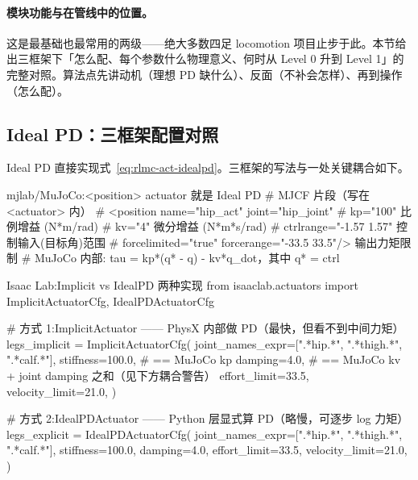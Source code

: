 \paragraph{模块功能与在管线中的位置。}这是最基础也最常用的两级——绝大多数四足 locomotion 项目止步于此。本节给出三框架下「怎么配、每个参数什么物理意义、何时从 Level 0 升到 Level 1」的完整对照。算法点先讲动机（理想 PD 缺什么）、反面（不补会怎样）、再到操作（怎么配）。

\subsection{Ideal PD：三框架配置对照}
\label{sec:rlmc-act-idealpd-cfg}

Ideal PD 直接实现式~\eqref{eq:rlmc-act-idealpd}。三框架的写法与一处关键耦合如下。

\begin{codebox}[Python]{mjlab/MuJoCo:<position> actuator 就是 Ideal PD}
# MJCF 片段（写在 <actuator> 内）
# <position name="hip_act" joint="hip_joint"
#           kp="100"                 比例增益 (N*m/rad)
#           kv="4"                   微分增益 (N*m*s/rad)
#           ctrlrange="-1.57 1.57"   控制输入(目标角)范围
#           forcelimited="true" forcerange="-33.5 33.5"/>  输出力矩限制
# MuJoCo 内部: tau = kp*(q* - q) - kv*q_dot，其中 q* = ctrl
\end{codebox}

\begin{codebox}[Python]{Isaac Lab:Implicit vs IdealPD 两种实现}
from isaaclab.actuators import ImplicitActuatorCfg, IdealPDActuatorCfg

# 方式 1:ImplicitActuator —— PhysX 内部做 PD（最快，但看不到中间力矩）
legs_implicit = ImplicitActuatorCfg(
    joint_names_expr=[".*hip.*", ".*thigh.*", ".*calf.*"],
    stiffness=100.0,     # == MuJoCo kp
    damping=4.0,         # == MuJoCo kv + joint damping 之和（见下方耦合警告）
    effort_limit=33.5, velocity_limit=21.0,
)

# 方式 2:IdealPDActuator —— Python 层显式算 PD（略慢，可逐步 log 力矩）
legs_explicit = IdealPDActuatorCfg(
    joint_names_expr=[".*hip.*", ".*thigh.*", ".*calf.*"],
    stiffness=100.0, damping=4.0, effort_limit=33.5, velocity_limit=21.0,
)
\end{codebox}

